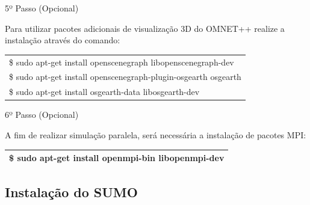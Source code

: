 \documentclass[
12pt,				%
openright,			%
oneside,			%
a4paper,			%
brazil,				%
]{abntex2}
\begin{document}
{\begin{anexosenv}

                	\begin{description}
		                \item[5º Passo (Opcional)]
		            \end{description}
		            \par Para utilizar pacotes adicionais de visualização 3D do OMNET++ realize a instalação através do comando:
		
		            \begin{table}[H]
			            \renewcommand{\arraystretch}{1.5}
		                \begin{tabular}{|p{15.5cm}|}
			                \hline
                            \$ sudo apt-get install openscenegraph libopenscenegraph-dev \\
                            \$ sudo apt-get install openscenegraph-plugin-osgearth osgearth \\
                            \$ sudo apt-get install osgearth-data libosgearth-dev \\
			                \hline
			            \end{tabular}
		            \end{table}
                    

                	\begin{description}
		                \item[6º Passo (Opcional)]
		            \end{description}
		            \par A fim de realizar simulação paralela, será necessária a instalação de pacotes MPI:
		
		            \begin{table}[H]
			            \renewcommand{\arraystretch}{1.5}
		                \begin{tabular}{|p{15.5cm}|}
			                \hline
                            \$ sudo apt-get install openmpi-bin libopenmpi-dev \\
			                \hline
			            \end{tabular}
		            \end{table}
                    
            	\subsection{Instalação do SUMO}


\end{anexosenv}}
\end{document}
